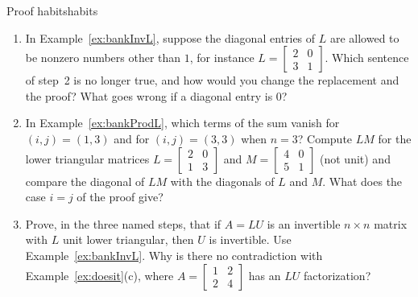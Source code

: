 \documentclass[11pt]{article}
\begin{document}
\begin{think}{Proof habits}{habits}
\begin{enumerate}[label=(\arabic*)]
  \item In Example~\ref{ex:bankInvL}, suppose the diagonal entries of $L$ are allowed to be nonzero numbers other than $1$, for instance $L=\begin{bmatrix}2&0\\3&1\end{bmatrix}$. Which sentence of step~2 is no longer true, and how would you change the replacement and the proof? What goes wrong if a diagonal entry is $0$?
  \item In Example~\ref{ex:bankProdL}, which terms of the sum vanish for $(i,j)=(1,3)$ and for $(i,j)=(3,3)$ when $n=3$? Compute $LM$ for the lower triangular matrices $L=\begin{bmatrix}2&0\\1&3\end{bmatrix}$ and $M=\begin{bmatrix}4&0\\5&1\end{bmatrix}$ (not unit) and compare the diagonal of $LM$ with the diagonals of $L$ and $M$. What does the case $i=j$ of the proof give?
  \item Prove, in the three named steps, that if $A=LU$ is an invertible $n\times n$ matrix with $L$ unit lower triangular, then $U$ is invertible. Use Example~\ref{ex:bankInvL}. Why is there no contradiction with Example~\ref{ex:doesit}(c), where $A=\begin{bmatrix}1&2\\2&4\end{bmatrix}$ has an $LU$ factorization?
\end{enumerate}
\end{think}
\end{document}
